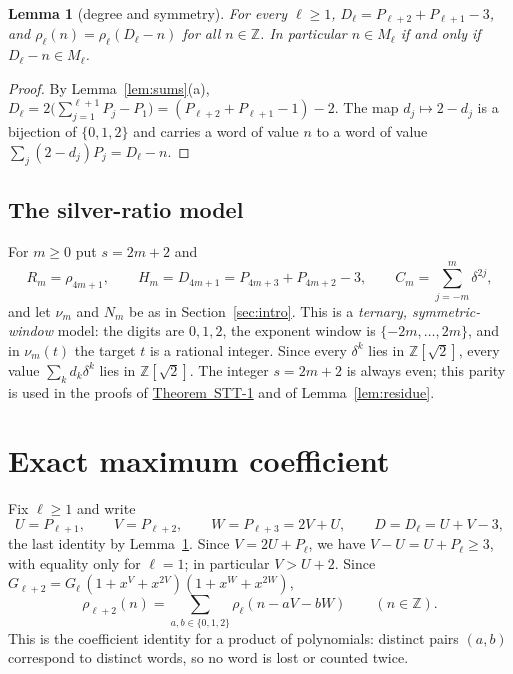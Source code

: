 \documentclass[11pt]{amsart}
\newtheorem{lemma}{Lemma}[section]
\theoremstyle{definition}
\theoremstyle{remark}
\theoremstyle{plain}
\numberwithin{equation}{section}
\newcommand{\Z}{\mathbb{Z}}
\newcommand{\STTone}{\hyperref[thm:stt1]{Theorem~STT-1}}
\begin{document}
\begin{lemma}[degree and symmetry]\label{lem:degree}
For every $\ell\ge1$, $D_\ell=P_{\ell+2}+P_{\ell+1}-3$, and $\rho_\ell(n)=\rho_\ell(D_\ell-n)$ for
all $n\in\Z$. In particular $n\in M_\ell$ if and only if $D_\ell-n\in M_\ell$.
\end{lemma}

\begin{proof}
By Lemma~\ref{lem:sums}(a),
$D_\ell=2\bigl(\sum_{j=1}^{\ell+1}P_j-P_1\bigr)=(P_{\ell+2}+P_{\ell+1}-1)-2$. The map
$d_j\mapsto2-d_j$ is a bijection of $\{0,1,2\}$ and carries a word of value $n$ to a word of value
$\sum_j(2-d_j)P_j=D_\ell-n$.
\end{proof}

\subsection{The silver-ratio model}\label{sec:silvermodel}
For $m\ge0$ put $s=2m+2$ and
\[
R_m=\rho_{4m+1},\qquad H_m=D_{4m+1}=P_{4m+3}+P_{4m+2}-3,\qquad C_m=\sum_{j=-m}^{m}\delta^{2j},
\]
and let $\nu_m$ and $N_m$ be as in Section~\ref{sec:intro}. This is a \emph{ternary, symmetric-window}
model: the digits are $0,1,2$, the exponent window is $\{-2m,\dots,2m\}$, and in $\nu_m(t)$ the
target $t$ is a rational integer. Since every $\delta^k$ lies in $\Z[\sqrt2]$, every value
$\sum_kd_k\delta^k$ lies in $\Z[\sqrt2]$. The integer $s=2m+2$ is always even; this parity is used in
the proofs of \STTone{} and of Lemma~\ref{lem:residue}.

\section{Exact maximum coefficient}\label{sec:pet1}

Fix $\ell\ge1$ and write
\[
U=P_{\ell+1},\qquad V=P_{\ell+2},\qquad W=P_{\ell+3}=2V+U,\qquad D=D_\ell=U+V-3,
\]
the last identity by Lemma~\ref{lem:degree}. Since $V=2U+P_\ell$, we have $V-U=U+P_\ell\ge3$, with
equality only for $\ell=1$; in particular $V>U+2$. Since
$G_{\ell+2}=G_\ell\,(1+x^V+x^{2V})(1+x^W+x^{2W})$,
\begin{equation}\label{eq:twostep}
\rho_{\ell+2}(n)=\sum_{a,b\in\{0,1,2\}}\rho_\ell(n-aV-bW)\qquad(n\in\Z).
\end{equation}
This is the coefficient identity for a product of polynomials: distinct pairs $(a,b)$ correspond to
distinct words, so no word is lost or counted twice.
\end{document}
